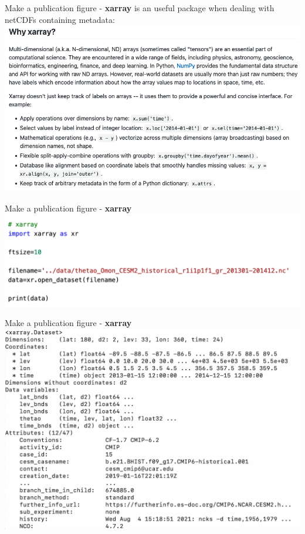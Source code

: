 \begin{frame}{\insertsectionnumber{ |} Make a publication figure - \textbf{xarray}}
    \href{https://xarray.pydata.org/}{} is an useful package when dealing with netCDFs containing metadata: \\
        \vspace{0.5cm}
    \includegraphics[scale=0.35]{images/xarray_info.png}
\end{frame}


\begin{frame}{\insertsectionnumber{ |} Make a publication figure - \textbf{xarray}}
    \includegraphics[scale=0.45]{images/xarray_1.png}
\end{frame}


\begin{frame}{\insertsectionnumber{ |} Make a publication figure - \textbf{xarray}}
    \includegraphics[scale=0.35]{images/print_xarray.png}
\end{frame}


